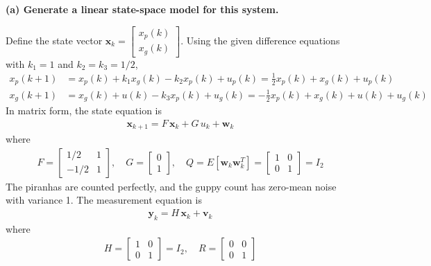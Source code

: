 \documentclass[12pt]{article}
\begin{document}
\begin{stepbox}
\textbf{(a) Generate a linear state-space model for this system.}

\vspace{0.3cm}

Define the state vector $\mathbf{x}_k = \begin{bmatrix} x_p(k) \\ x_g(k) \end{bmatrix}$. Using the given difference equations with $k_1 = 1$ and $k_2 = k_3 = 1/2$,
\begin{align}
x_p(k+1) &= x_p(k) + k_1 x_g(k) - k_2 x_p(k) + u_p(k) = \tfrac{1}{2} x_p(k) + x_g(k) + u_p(k) \\
x_g(k+1) &= x_g(k) + u(k) - k_3 x_p(k) + u_g(k) = -\tfrac{1}{2} x_p(k) + x_g(k) + u(k) + u_g(k)
\end{align}
In matrix form, the state equation is
\begin{align}
\mathbf{x}_{k+1} = F\,\mathbf{x}_k + G\,u_k + \mathbf{w}_k
\end{align}
where
\begin{align}
F = \begin{bmatrix} 1/2 & 1 \\ -1/2 & 1 \end{bmatrix}, \quad
G = \begin{bmatrix} 0 \\ 1 \end{bmatrix}, \quad
Q = E[\mathbf{w}_k \mathbf{w}_k^T] = \begin{bmatrix} 1 & 0 \\ 0 & 1 \end{bmatrix} = I_2
\end{align}
The piranhas are counted perfectly, and the guppy count has zero-mean noise with variance 1. The measurement equation is
\begin{align}
\mathbf{y}_k = H\,\mathbf{x}_k + \mathbf{v}_k
\end{align}
where
\begin{align}
H = \begin{bmatrix} 1 & 0 \\ 0 & 1 \end{bmatrix} = I_2, \quad
R = \begin{bmatrix} 0 & 0 \\ 0 & 1 \end{bmatrix}
\end{align}

\end{stepbox}
\end{document}
